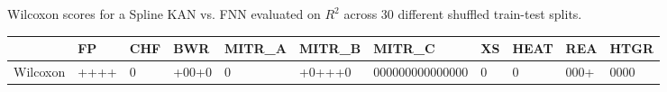 \caption{Wilcoxon scores for a Spline KAN vs. FNN evaluated on $R^2$ across 30 different shuffled train-test splits.}
\begin{tabular}{lllllllllll}
\toprule
 & FP & CHF & BWR & MITR_A & MITR_B & MITR_C & XS & HEAT & REA & HTGR \\
\midrule
Wilcoxon & ++++ & 0 & +00+0 & 0 & +0+++0 & 000000000000000 & 0 & 0 & 000+ & 0000 \\
\bottomrule
\end{tabular}
